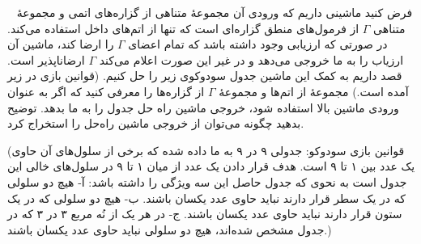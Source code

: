 ~
فرض کنید ماشینی داریم که ورودی آن مجموعهٔ متناهی  \textsc{} از گزاره‌های اتمی و مجموعهٔ متناهی $\Gamma$ از فرمول‌های منطق گزاره‌ای است که تنها از اتم‌های داخل \textsc{} استفاده می‌کند. در صورتی که ارزیابی وجود داشته باشد که تمام اعضای $\Gamma$ را ارضا کند، ماشین آن ارزیاب را به ما خروجی می‌دهد و در غیر این صورت اعلام می‌کند $\Gamma$ ارضاناپذیر است. قصد داریم به کمک این ماشین جدول سودوکوی زیر را حل کنیم. (قوانین بازی در زیر آمده است.) مجموعهٔ \textsc{} از اتم‌ها و مجموعهٔ $\Gamma$ از گزاره‌ها را معرفی کنید که اگر به عنوان ورودی ماشین بالا استفاده شود، خروجی ماشین راه حل جدول را به ما بدهد. توضیح بدهید چگونه می‌توان از خروجی ماشین راه‌حل را استخراج کرد.
\vspace*{5mm}
\begin{LTR}\centering
  \cluefont{\normalsize}
\end{LTR}
\vspace*{5mm}
(قوانین بازی سودوکو: جدولی ۹ در ۹ به ما داده شده که برخی از سلول‌های آن حاوی یک عدد بین ۱ تا ۹ است. هدف قرار دادن یک عدد از میان ۱ تا ۹ در سلول‌های خالی این جدول است به نحوی که جدول حاصل این سه ویژگی را داشته باشد: آ- هیچ دو سلولی که در یک سطر قرار دارند نباید حاوی عدد یکسان باشند. ب- هیچ دو سلولی که در یک ستون قرار دارند نباید حاوی عدد یکسان باشند. ج- در هر یک از نُه مربع ۳ در ۳ که در جدول مشخص شده‌اند، هیچ دو سلولی نباید حاوی عدد یکسان باشند.)
